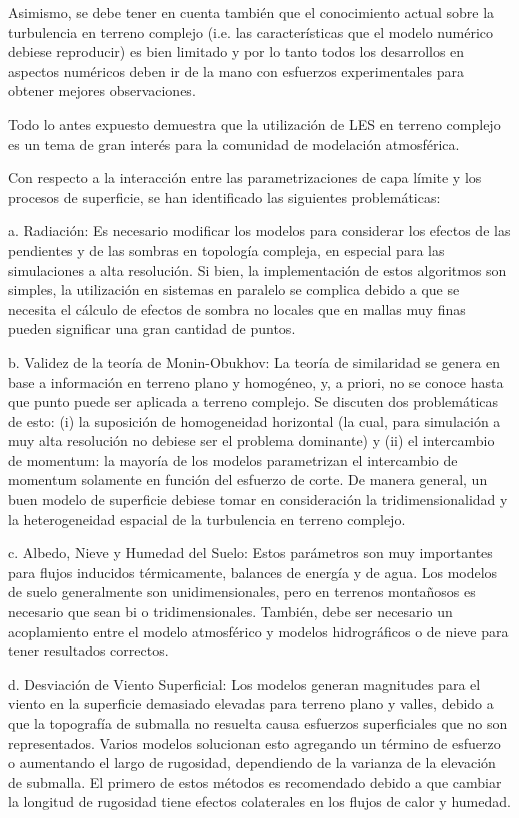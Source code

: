 Asimismo, se debe tener en cuenta también que el conocimiento actual sobre la turbulencia en terreno complejo (i.e. las características que el modelo numérico debiese reproducir) es bien limitado y por lo tanto todos los desarrollos en aspectos numéricos deben ir de la mano con esfuerzos experimentales para obtener mejores observaciones.

Todo lo antes expuesto demuestra que la utilización de LES en terreno complejo es un tema de gran interés para la comunidad de modelación atmosférica.

Con respecto a la interacción entre las parametrizaciones de capa límite y los procesos de superficie, se han identificado las siguientes problemáticas:
\begin{enumerate*}
	\item[a.] Radiación: Es necesario modificar los modelos para considerar los efectos de las pendientes y de las sombras en topología compleja, en especial para las simulaciones a alta resolución. Si bien, la implementación de estos algoritmos son simples, la utilización en sistemas en paralelo se complica debido a que se necesita el cálculo de efectos de sombra no locales que en mallas muy finas pueden significar una gran cantidad de puntos.
	\item[b.] Validez de la teoría de Monin-Obukhov: La teoría de similaridad se genera en base a información en terreno plano y homogéneo, y, a priori, no se conoce hasta que punto puede ser aplicada a terreno complejo. Se discuten dos problemáticas de esto: (i) la suposición de homogeneidad horizontal (la cual, para simulación a muy alta resolución no debiese ser el problema dominante) y (ii) el intercambio de momentum: la mayoría de los modelos parametrizan el intercambio de momentum solamente en función del esfuerzo de corte. De manera general, un buen modelo de superficie debiese tomar en consideración la tridimensionalidad y la heterogeneidad espacial de la turbulencia en terreno complejo.
	\item[c.] Albedo, Nieve y Humedad del Suelo: Estos parámetros son muy importantes para flujos inducidos térmicamente, balances de energía y de agua. Los modelos de suelo generalmente son unidimensionales, pero en terrenos montañosos es necesario  que sean bi o tridimensionales. También, debe ser necesario un acoplamiento entre el modelo atmosférico  y modelos hidrográficos o de nieve para tener resultados correctos. 
	\item[d.] Desviación de Viento Superficial: Los modelos generan magnitudes para el viento en la superficie demasiado elevadas para terreno plano y valles, debido a que la topografía de submalla no resuelta causa esfuerzos superficiales que no son representados. Varios modelos solucionan esto agregando un término de esfuerzo o aumentando el largo de rugosidad, dependiendo de la varianza de la elevación de submalla. El primero de estos métodos es recomendado debido a que cambiar la longitud de rugosidad tiene efectos colaterales en los flujos de calor y humedad.

\end{enumerate*}
